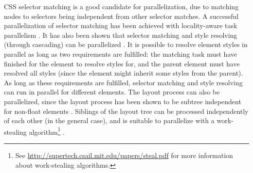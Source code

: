 \documentclass[a4paper,11pt]{kth-mag}
\begin{document}
        \gls{CSS} selector matching is a good candidate for parallelization, due to matching nodes to selectors being independent from other selector matches.
        A successful parallelization of selector matching has been achieved with locality-aware task parallelism \cite{parallelizing_the_web_browser}.
        It has also been shown that selector matching and style resolving (through cascading) can be parallelized \cite{zoomm}.
        It is possible to resolve \gls{element} styles in parallel as long as two requirements are fulfilled: the matching task must have finished for the \gls{element} to resolve styles for, and the parent \gls{element} must have resolved all styles (since the \gls{element} might inherit some styles from the parent).
        As long as these requirements are fulfilled, selector matching and style resolving can run in parallel for different \glspl{element}.
        The layout process can also be parallelized, since the layout process has been shown to be subtree independent for non-float \glspl{element} \cite{servo_parallel,servo_blog}.
        Siblings of the layout tree can be processed independently of each other (in the general case), and is suitable to parallelize with a work-stealing algorithm\footnote{See \url{http://supertech.csail.mit.edu/papers/steal.pdf} for more information about work-stealing algorithms.} \cite{meyerovich2010fast}.
\end{document}

